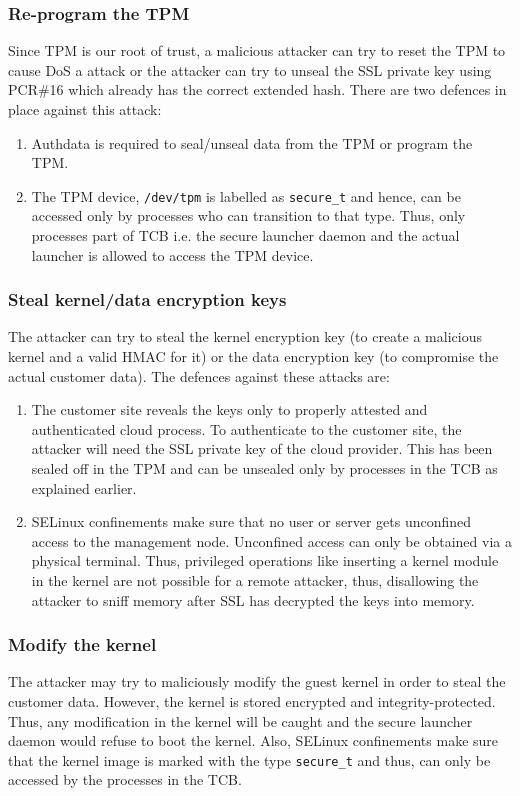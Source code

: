 \documentclass[10pt,twocolumn,pdftex]{article}
\begin{document}
\subsubsection{Re-program the TPM}
Since TPM is our root of trust, a malicious attacker can try to reset the TPM to cause DoS a attack or the attacker can try to unseal the SSL private key using PCR\#16 which already has the correct extended hash. There are two defences in place against this attack:
\begin{enumerate}
\item Authdata is required to seal/unseal data from the TPM or program the TPM.
\item The TPM device, {\tt /dev/tpm} is labelled as {\tt secure\_t} and hence, can be accessed only by processes who can transition to that type. Thus, only processes part of TCB i.e. the secure launcher daemon and the actual launcher is allowed to access the TPM device.
\end{enumerate}

\subsubsection{Steal kernel/data encryption keys}
The attacker can try to steal the kernel encryption key (to create a malicious kernel and a valid HMAC for it) or the data encryption key (to compromise the actual customer data). The defences against these attacks are:
\begin{enumerate}
\item The customer site reveals the keys only to properly attested and authenticated cloud process. To authenticate to the customer site, the attacker will need the SSL private key of the cloud provider. This has been sealed off in the TPM and can be unsealed only by processes in the TCB as explained earlier. 
\item SELinux confinements make sure that no user or server gets unconfined access to the management node. Unconfined access can only be obtained via a physical terminal. Thus, privileged operations like inserting a kernel module in the kernel are not possible for a remote attacker, thus, disallowing the attacker to sniff memory after SSL has decrypted the keys into memory.
\end{enumerate}

\subsubsection{Modify the kernel}
The attacker may try to maliciously modify the guest kernel in order to steal the customer data. However, the kernel is stored encrypted and integrity-protected. Thus, any modification in the kernel will be caught and the secure launcher daemon would refuse to boot the kernel. Also, SELinux confinements make sure that the kernel image is marked with the type {\tt secure\_t} and thus, can only be accessed by the processes in the TCB.
\end{document}
